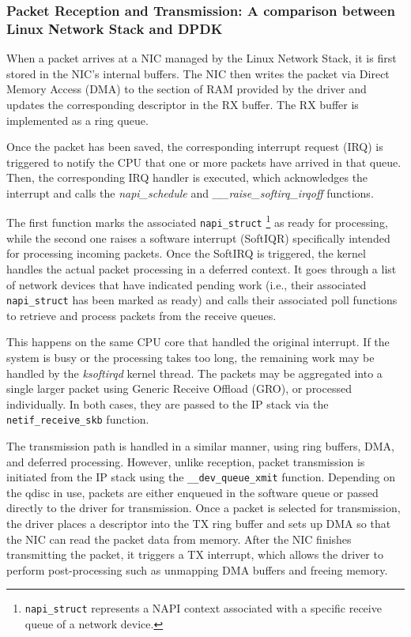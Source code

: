 \subsubsection{Packet Reception and Transmission: A comparison between Linux Network Stack and DPDK}
When a packet arrives at a NIC managed by the Linux Network Stack, it is first stored in the NIC’s internal buffers. 
The NIC then writes the packet via Direct Memory Access (DMA) to the section of RAM provided by the driver and updates the corresponding descriptor in the RX buffer. 
The RX buffer is implemented as a ring queue.

Once the packet has been saved, the corresponding interrupt request (IRQ) is triggered to notify the CPU that one or more packets have arrived in that queue. 
Then, the corresponding IRQ handler is executed, which acknowledges the interrupt and calls the \textit{napi\_schedule} and \textit{\_\_raise\_softirq\_irqoff} functions.

The first function marks the associated \texttt{napi\_struct}%
\footnote{\texttt{napi\_struct} represents a NAPI context associated with a specific receive queue of a network device.}
 as ready for processing, while the second one raises a software interrupt (SoftIQR) specifically intended for processing incoming packets. 
Once the SoftIRQ is triggered, the kernel handles the actual packet processing in a deferred context. 
It goes through a list of network devices that have indicated pending work (i.e., their associated \texttt{napi\_struct} has been marked as ready) 
and calls their associated poll functions to retrieve and process packets from the receive queues.

This happens on the same CPU core that handled the original interrupt. If the system is busy or the processing takes too long, the remaining work may be handled by the \textit{ksoftirqd} kernel thread. 
The packets may be aggregated into a single larger packet using Generic Receive Offload (GRO), or processed individually. 
In both cases, they are passed to the IP stack via the \texttt{netif\_receive\_skb} function.

The transmission path is handled in a similar manner, using ring buffers, DMA, and deferred processing. 
However, unlike reception, packet transmission is initiated from the IP stack using the \texttt{\_\_dev\_queue\_xmit} function. 
Depending on the qdisc in use, packets are either enqueued in the software queue or passed directly to the driver for transmission.
Once a packet is selected for transmission, the driver places a descriptor into the TX ring buffer and sets up DMA so that the NIC can read the packet data from memory.
After the NIC finishes transmitting the packet, it triggers a TX interrupt, which allows the driver to perform post-processing such as unmapping DMA buffers and freeing memory.\cite{linux-packet-input}


